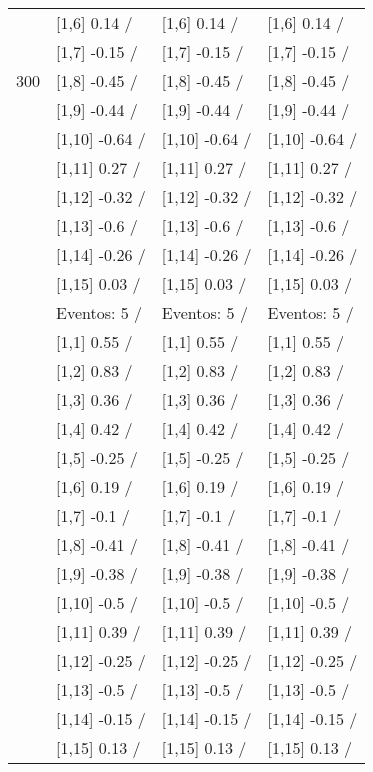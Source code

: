 \begin{table}
\begin{tabular}[t]{llll}
 & {}[1,6] 0.14  / & {}[1,6] 0.14  / & {}[1,6] 0.14  /\\
 & {}[1,7] -0.15  / & {}[1,7] -0.15  / & {}[1,7] -0.15  /\\
300 & {}[1,8] -0.45  / & {}[1,8] -0.45  / & {}[1,8] -0.45  /\\
\addlinespace
 & {}[1,9] -0.44  / & {}[1,9] -0.44  / & {}[1,9] -0.44  /\\
 & {}[1,10] -0.64  / & {}[1,10] -0.64  / & {}[1,10] -0.64  /\\
 & {}[1,11] 0.27  / & {}[1,11] 0.27  / & {}[1,11] 0.27  /\\
 & {}[1,12] -0.32  / & {}[1,12] -0.32  / & {}[1,12] -0.32  /\\
 & {}[1,13] -0.6  / & {}[1,13] -0.6  / & {}[1,13] -0.6  /\\
\addlinespace
 & {}[1,14] -0.26  / & {}[1,14] -0.26  / & {}[1,14] -0.26  /\\
 & {}[1,15] 0.03  / & {}[1,15] 0.03  / & {}[1,15] 0.03  /\\
 & Eventos:  5 / & Eventos:  5 / & Eventos:  5 /\\
 & {}[1,1] 0.55  / & {}[1,1] 0.55  / & {}[1,1] 0.55  /\\
 & {}[1,2] 0.83  / & {}[1,2] 0.83  / & {}[1,2] 0.83  /\\
\addlinespace
 & {}[1,3] 0.36  / & {}[1,3] 0.36  / & {}[1,3] 0.36  /\\
 & {}[1,4] 0.42  / & {}[1,4] 0.42  / & {}[1,4] 0.42  /\\
 & {}[1,5] -0.25  / & {}[1,5] -0.25  / & {}[1,5] -0.25  /\\
 & {}[1,6] 0.19  / & {}[1,6] 0.19  / & {}[1,6] 0.19  /\\
 & {}[1,7] -0.1  / & {}[1,7] -0.1  / & {}[1,7] -0.1  /\\
\addlinespace
500 & {}[1,8] -0.41  / & {}[1,8] -0.41  / & {}[1,8] -0.41  /\\
 & {}[1,9] -0.38  / & {}[1,9] -0.38  / & {}[1,9] -0.38  /\\
 & {}[1,10] -0.5  / & {}[1,10] -0.5  / & {}[1,10] -0.5  /\\
 & {}[1,11] 0.39  / & {}[1,11] 0.39  / & {}[1,11] 0.39  /\\
 & {}[1,12] -0.25  / & {}[1,12] -0.25  / & {}[1,12] -0.25  /\\
\addlinespace
 & {}[1,13] -0.5  / & {}[1,13] -0.5  / & {}[1,13] -0.5  /\\
 & {}[1,14] -0.15  / & {}[1,14] -0.15  / & {}[1,14] -0.15  /\\
 & {}[1,15] 0.13  / & {}[1,15] 0.13  / & {}[1,15] 0.13  /\\
\bottomrule
\end{tabular}
\end{table}
